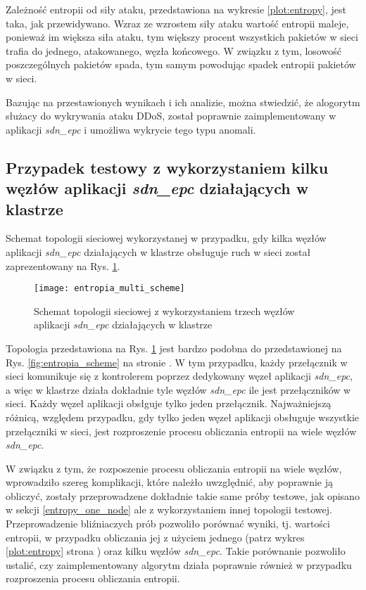 Zależność entropii od siły ataku, przedstawiona na wykresie \ref{plot:entropy},
jest taka, jak przewidywano. Wzraz ze wzrostem siły ataku wartość entropii
maleje, ponieważ im większa siła ataku, tym większy procent wszystkich pakietów
w sieci trafia do jednego, atakowanego, węzła końcowego. W związku z tym,
losowość poszczególnych pakietów spada, tym samym powodując spadek entropii
pakietów w sieci.

Bazując na przestawionych wynikach i ich analizie, można stwiedzić, że alogorytm
służacy do wykrywania ataku DDoS, został poprawnie zaimplementowany w aplikacji
\textit{sdn\_epc} i umożliwa wykrycie tego typu anomali. 

\subsection{Przypadek testowy z wykorzystaniem kilku węzłów aplikacji
  \textit{sdn\_epc} działających w klastrze} \label{entropy_multi_node}

Schemat topologii sieciowej wykorzystanej w przypadku, gdy kilka węzłów
aplikacji \textit{sdn\_epc} działających w klastrze obsługuje ruch w sieci
został zaprezentowany na Rys. \ref{fig:entropia_multi_scheme}.
\newpage

\begin{figure}[h]
\centering
\texttt{[image: entropia\_multi\_scheme]}
\caption{Schemat topologii sieciowej z wykorzystaniem trzech węzłów aplikacji
  \textit{sdn\_epc} działających w klastrze}
\label{fig:entropia_multi_scheme}
\end{figure}

Topologia przedstawiona na Rys. \ref{fig:entropia_multi_scheme} jest bardzo
podobna do przedstawionej na Rys. \ref{fig:entropia_scheme} na stronie
\pageref{fig:entropia_scheme}. W tym przypadku, każdy przełącznik w sieci
komunikuje się z kontrolerem poprzez dedykowany węzeł aplikacji
\textit{sdn\_epc}, a więc w klastrze działa dokładnie tyle węzłów
\textit{sdn\_epc} ile jest przełączników w sieci. Każdy węzeł aplikacji obsłguje
tylko jeden przełącznik. Najważniejszą różnicą, względem przypadku, gdy tylko
jeden węzeł aplikacji obsługuje wszystkie przełączniki w sieci, jest 
rozproszenie procesu obliczania entropii na wiele węzłów \textit{sdn\_epc}.

W związku z tym, że rozposzenie procesu obliczania entropii na wiele węzłów,
wprowadziło szereg komplikacji, które należło uwzględnić, aby poprawnie ją
obliczyć, zostały przeprowadzene dokładnie takie same próby testowe, jak opisano
w sekcji \ref{entropy_one_node} ale z wykorzystaniem innej topologii testowej.
Przeprowadzenie bliźniaczych prób pozwoliło porównać wyniki, tj. wartości
entropii, w przypadku obliczania jej z użyciem jednego (patrz wykres
\ref{plot:entropy} strona \pageref{plot:entropy}) oraz kilku węzłów
\textit{sdn\_epc}. Takie porównanie pozwoliło ustalić, czy zaimplementowany
algorytm działa poprawnie również w przypadku rozproszenia procesu obliczania
entropii.

